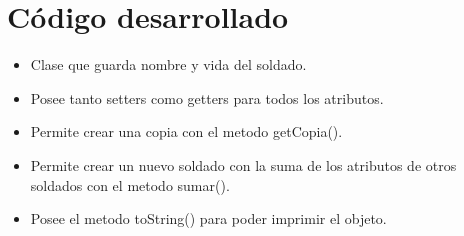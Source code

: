 \documentclass{article}
\begin{document}
\section{Código desarrollado}

\begin{itemize}
	\item Clase que guarda nombre y vida del soldado.
	\item Posee tanto setters como getters para todos los atributos.
	\item Permite crear una copia con el metodo getCopia().
	\item Permite crear un nuevo soldado con la suma de los atributos de otros soldados con el metodo sumar().
	\item Posee el metodo toString() para poder imprimir el objeto.
\end{itemize}
\pagebreak

\end{document}
